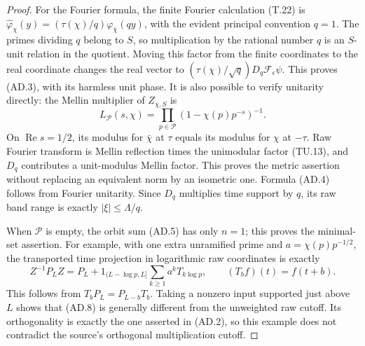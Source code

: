 \begin{proof}
For the Fourier formula, the finite Fourier
calculation (T.22) is
\(\widehat\varphi_\chi(y)
 =(\tau(\chi)/q)\varphi_{\bar\chi}(qy)\),
with the evident principal convention \(q=1\).
The primes dividing \(q\) belong to \(S\), so
multiplication by the rational number \(q\)
is an \(S\)-unit relation in the quotient.
Moving this factor from the finite coordinates
to the real coordinate changes the real vector
to \((\tau(\chi)/\sqrt q)D_q\mathcal F_\epsilon\psi\).
This proves (AD.3), with its harmless unit phase.
It is also possible to verify unitarity directly:
the Mellin multiplier of \(Z_{\chi,S}\) is
\[
 L_{\mathcal P}(s,\chi)
       =\prod_{p\in\mathcal P}(1-\chi(p)p^{-s})^{-1}.
 \tag{AD.7}
\]
On \(\operatorname{Re}s=1/2\), its modulus for
\(\bar\chi\) at \(\tau\) equals its modulus for
\(\chi\) at \(-\tau\).
Raw Fourier transform is Mellin reflection
times the unimodular factor (TU.13), and
\(D_q\) contributes a unit-modulus Mellin factor.
This proves the metric assertion without
replacing an equivalent norm by an isometric one.
Formula (AD.4) follows from Fourier unitarity.
Since \(D_q\) multiplies time support by \(q\),
its raw band range is exactly
\(|\xi|\leq\Lambda/q\).

When \(\mathcal P\) is empty, the orbit sum (AD.5)
has only \(n=1\); this proves the minimal-set
assertion.  For example, with one extra unramified
prime and \(a=\chi(p)p^{-1/2}\), the transported
time projection in logarithmic raw coordinates
is exactly
\[
 Z^{-1}P_LZ
   =P_L+
       1_{(L-\log p,L]}\sum_{k\geq1}a^kT_{k\log p},
 \qquad (T_bf)(t)=f(t+b).
 \tag{AD.8}
\]
This follows from \(T_bP_L=P_{L-b}T_b\).
Taking a nonzero input supported just above \(L\)
shows that (AD.8) is generally different from
the unweighted raw cutoff.
Its orthogonality is exactly the one asserted
in (AD.2), so this example does not contradict
the source's orthogonal multiplication cutoff.
\end{proof}

